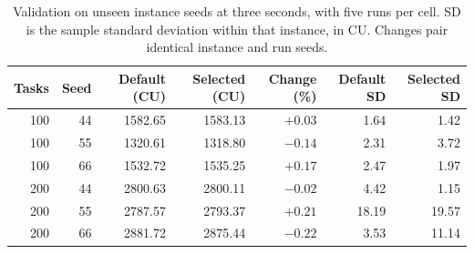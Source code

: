 \begin{table}[htbp]
\centering
\small
\caption{Validation on unseen instance seeds at three seconds, with five runs per cell. SD is the sample standard deviation within that instance, in CU. Changes pair identical instance and run seeds.}
\label{tab:ga-validation}
\begin{tabular}{rrrrrrr}
\toprule
Tasks & Seed & Default (CU) & Selected (CU) & Change (\%) & Default SD & Selected SD \\
\midrule
100 & 44 & 1582.65 & 1583.13 & $+0.03$ & 1.64 & 1.42 \\
100 & 55 & 1320.61 & 1318.80 & $-0.14$ & 2.31 & 3.72 \\
100 & 66 & 1532.72 & 1535.25 & $+0.17$ & 2.47 & 1.97 \\
200 & 44 & 2800.63 & 2800.11 & $-0.02$ & 4.42 & 1.15 \\
200 & 55 & 2787.57 & 2793.37 & $+0.21$ & 18.19 & 19.57 \\
200 & 66 & 2881.72 & 2875.44 & $-0.22$ & 3.53 & 11.14 \\
\bottomrule
\end{tabular}
\end{table}
